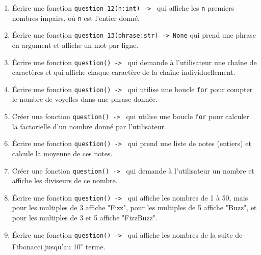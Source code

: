 \begin{enumerate}
    \item Écrire une fonction \lstinline{question_12(n:int) -> } qui affiche les \lstinline{n} premiers nombres impairs, où \lstinline{n} est l'entier donné.

    \item Écrire une fonction \lstinline{question_13(phrase:str) -> None} qui prend une phrase en argument et affiche un mot par ligne.

    \item Écrire une fonction \lstinline{question() -> } qui demande à l'utilisateur une chaîne de caractères et qui affiche chaque caractère de la chaîne individuellement.

    \item Écrire une fonction \lstinline{question() -> } qui utilise une boucle \lstinline{for} pour compter le nombre de voyelles dans une phrase donnée.

    \item Créer une fonction \lstinline{question() -> } qui utilise une boucle \lstinline{for} pour calculer la factorielle d'un nombre donné par l'utilisateur.

    \item Écrire une fonction \lstinline{question() -> } qui prend une liste de notes (entiers) et calcule la moyenne de ces notes.

    \item Créer une fonction \lstinline{question() -> } qui demande à l'utilisateur un nombre et affiche les diviseurs de ce nombre.

    \item Écrire une fonction \lstinline{question() -> } qui affiche les nombres de 1 à 50, mais pour les multiples de 3 affiche "Fizz", pour les multiples de 5 affiche "Buzz", et pour les multiples de 3 et 5 affiche "FizzBuzz".

    \item Écrire une fonction \lstinline{question() -> } qui affiche les nombres de la suite de Fibonacci jusqu'au 10\textsuperscript{e} terme.

\end{enumerate}

